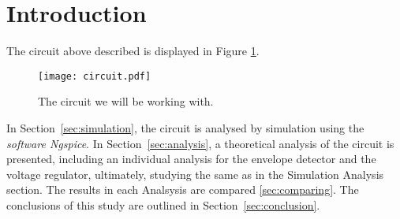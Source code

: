 \newpage
\section{Introduction}
\label{sec:introduction}



The circuit above described is displayed in Figure \ref{fig:circuit}.

\begin{figure}[h] \centering
\texttt{[image: circuit.pdf]}
\caption{The circuit we will be working with.}
\label{fig:circuit}
\end{figure}



In Section~\ref{sec:simulation}, the circuit is analysed by
simulation using the \textit{software Ngspice}. In Section~\ref{sec:analysis}, a theoretical analysis of the circuit is
presented, including an individual analysis for the envelope detector and the voltage regulator, ultimately, studying the same as in the Simulation Analysis section.
The results in each Analsysis are compared \ref{sec:comparing}.
The conclusions of this study are outlined in
Section~\ref{sec:conclusion}.
